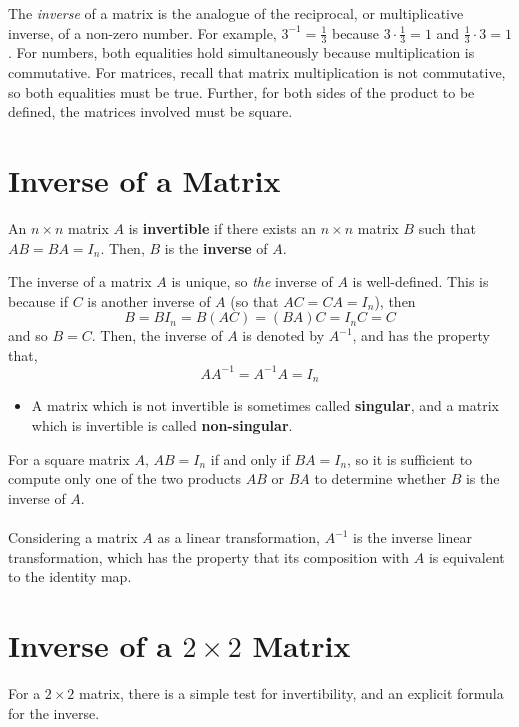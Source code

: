 \documentclass[letterpaper,12pt]{article}
\begin{document}
The \textit{inverse} of a matrix is the analogue of the reciprocal, or multiplicative inverse, of a non-zero number. For example, $3^{-1} = \frac{1}{3}$ because $3 \cdot \frac{1}{3} = 1$ and $\frac{1}{3} \cdot 3 = 1$. For numbers, both equalities hold simultaneously because multiplication is commutative. For matrices, recall that matrix multiplication is not commutative, so both equalities must be true. Further, for both sides of the product to be defined, the matrices involved must be square.

\section*{Inverse of a Matrix}
\begin{definition}
An $n \times n$ matrix $A$ is \textbf{invertible} if there exists an $n \times n$ matrix $B$ such that $AB = BA = I_n$. Then, $B$ is the \textbf{inverse} of $A$.
\end{definition}

The inverse of a matrix $A$ is unique, so \textit{the} inverse of $A$ is well-defined. This is because if $C$ is another inverse of $A$ (so that $AC = CA = I_n$), then
\begin{equation*}
    B = BI_n = B(AC) = (BA)C = I_n C = C
\end{equation*}
and so $B = C$. Then, the inverse of $A$ is denoted by $A^{-1}$, and has the property that,
\begin{equation*}
    AA^{-1} = A^{-1} A = I_n
\end{equation*}

\begin{itemize}
    \item A matrix which is not invertible is sometimes called \textbf{singular}, and a matrix which is invertible is called \textbf{non-singular}.
\end{itemize}

For a square matrix $A$, $AB = I_n$ if and only if $BA = I_n$, so it is sufficient to compute only one of the two products $AB$ or $BA$ to determine whether $B$ is the inverse of $A$.
\\ \\ Considering a matrix $A$ as a linear transformation, $A^{-1}$ is the inverse linear transformation, which has the property that its composition with $A$ is equivalent to the identity map.



\section*{Inverse of a $2 \times 2$ Matrix}
For a $2 \times 2$ matrix, there is a simple test for invertibility, and an explicit formula for the inverse.
\end{document}
